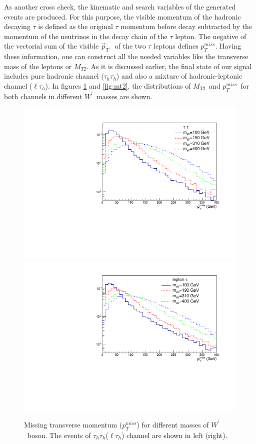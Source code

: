 \documentclass[preprint,showpacs,preprintnumbers]{revtex4}
\newcommand{\wprime}{\ensuremath{W^\prime}~}
\newcommand{\tauTau}{\ensuremath{\tau_h\tau_h}}
\newcommand{\lepTau}{\ensuremath{\ell\tau_h}}
\newcommand{\mttwo}{\ensuremath{M_{T2}}}
\newcommand{\MET}{\ensuremath{p_T^{miss}}}
\begin{document}
As another cross check, the kinematic  and search  variables of the generated events are produced. 
For this purpose, the visible momentum of the hadronic decaying $\tau$ is defined as the original $\tau$ momentum before decay subtracted by the momentum of the neutrinos in the decay chain of the $\tau$ lepton. The negative of the vectorial sum of the visible $\vec{p}_T$ ~of the two $\tau$ leptons defines \MET. Having these information, one can construct all the needed variables like the transverse mass of the leptons or \mttwo. 
As it is discussed earlier, the final state of our signal includes pure hadronic channel (\tauTau) and also a mixture of hadronic-leptonic channel (\lepTau ).  In figures \ref{fig:met} and \ref{fig:mt2}, the distributions of \mttwo ~and \MET ~for both channels in different \wprime masses are shown.
\begin{figure}[htb]
	\centering
	\includegraphics*[width=.45\textwidth]{MET_hh.pdf}
	\hspace{3mm}
	\includegraphics*[width=.45\textwidth]{MET_lh.pdf}
	\caption{Missing transverse momentum (\MET) for different masses of \wprime boson. The events of \tauTau(\lepTau) channel are shown in left (right).}
	\label{fig:met}
\end{figure}
\end{document}
